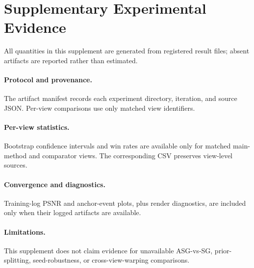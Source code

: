 \section{Supplementary Experimental Evidence}
All quantities in this supplement are generated from registered result files; absent artifacts are reported rather than estimated.
\paragraph{Protocol and provenance.} The artifact manifest records each experiment directory, iteration, and source JSON. Per-view comparisons use only matched view identifiers.

\paragraph{Per-view statistics.} Bootstrap confidence intervals and win rates are available only for matched main-method and comparator views. The corresponding CSV preserves view-level sources.

\paragraph{Convergence and diagnostics.} Training-log PSNR and anchor-event plots, plus render diagnostics, are included only when their logged artifacts are available.
\paragraph{Limitations.} This supplement does not claim evidence for unavailable ASG-vs-SG, prior-splitting, seed-robustness, or cross-view-warping comparisons.
